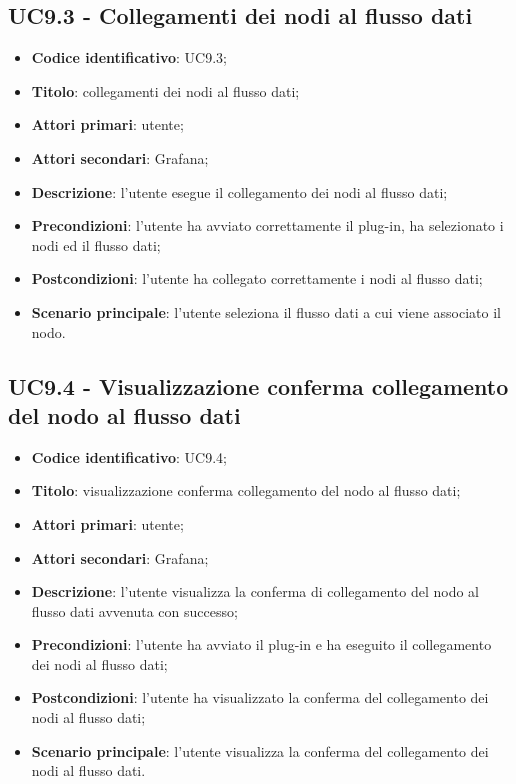 \subsection{UC9.3 - Collegamenti dei nodi al flusso dati}
\begin{itemize}
	\item \textbf{Codice identificativo}: UC9.3;
	\item \textbf{Titolo}: collegamenti dei nodi al flusso dati;
	\item \textbf{Attori primari}: utente;
	\item \textbf{Attori secondari}: Grafana\glo;
	\item \textbf{Descrizione}: l'utente esegue il collegamento dei nodi al flusso dati;
	\item \textbf{Precondizioni}: l'utente ha avviato correttamente il plug-in, ha selezionato i nodi ed il flusso dati;
	\item \textbf{Postcondizioni}: l'utente ha collegato correttamente i nodi al flusso dati;
	\item \textbf{Scenario principale}: l'utente seleziona il flusso dati a cui viene associato il nodo.
\end{itemize}

\subsection{UC9.4 - Visualizzazione conferma collegamento del nodo al flusso dati}
\begin{itemize}
	\item \textbf{Codice identificativo}: UC9.4;
	\item \textbf{Titolo}: visualizzazione conferma collegamento del nodo al flusso dati;
	\item \textbf{Attori primari}: utente;
	\item \textbf{Attori secondari}: Grafana\glo;
	\item \textbf{Descrizione}: l'utente visualizza la conferma di collegamento del nodo al flusso dati avvenuta con successo;
	\item \textbf{Precondizioni}: l'utente ha avviato il plug-in e ha eseguito il collegamento dei nodi al flusso dati;
	\item \textbf{Postcondizioni}: l'utente ha visualizzato la conferma del collegamento dei nodi al flusso dati;
	\item \textbf{Scenario principale}: l'utente visualizza la conferma del collegamento dei nodi al flusso dati.
\end{itemize}